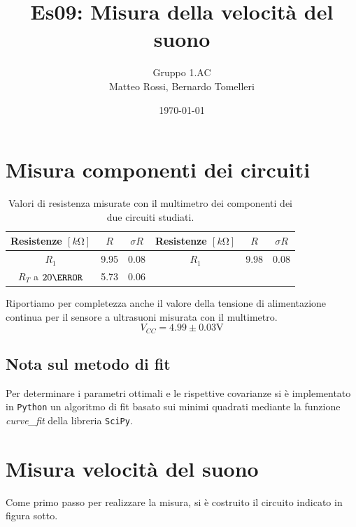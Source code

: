 \documentclass[10pt, a4paper, italian]{article}
\author{Gruppo 1.AC \\ Matteo Rossi, Bernardo Tomelleri}
\title{Es09: Misura della velocità del suono}
\begin{document}
\date{\today}
\maketitle

\setcounter{section}{0}

\section*{Misura componenti dei circuiti}
\begin{table}[htbp]
\centering
\begin{tabular}{ccc|ccc}
\toprule
Resistenze $[\si{k\ohm}]$ & $R$ & $\sigma R$ & Resistenze $[\si{k\ohm}]$ & $R$ &
$\sigma R$ \\
\midrule
\midrule
$R_1$	  	& 9.95 	& 0.08		& $R_1$ & 9.98	& 0.08 \\
$R_T$ a $20 \degreeCelsius$ & 5.73 & 0.06 & & \\ 
\bottomrule
\end{tabular}
\caption{Valori di resistenza misurate con il multimetro dei componenti dei
due circuiti studiati. \label{tab: rcmes_B}}
\end{table}

Riportiamo per completezza anche il valore della tensione di alimentazione
continua per il sensore a ultrasuoni misurata con il multimetro.
\[
V_{CC} = 4.99 \pm 0.03 \si{\V}
\]

\subsection*{Nota sul metodo di fit}
Per determinare i parametri ottimali e le rispettive covarianze si \`e
implementato in \verb+Python+ un algoritmo di fit basato sui minimi quadrati
mediante la funzione \emph{curve\_fit} della libreria \texttt{SciPy}.

\section{Misura velocità del suono}
Come primo passo per realizzare la misura, si è costruito il circuito indicato in figura sotto.
\end{document}
